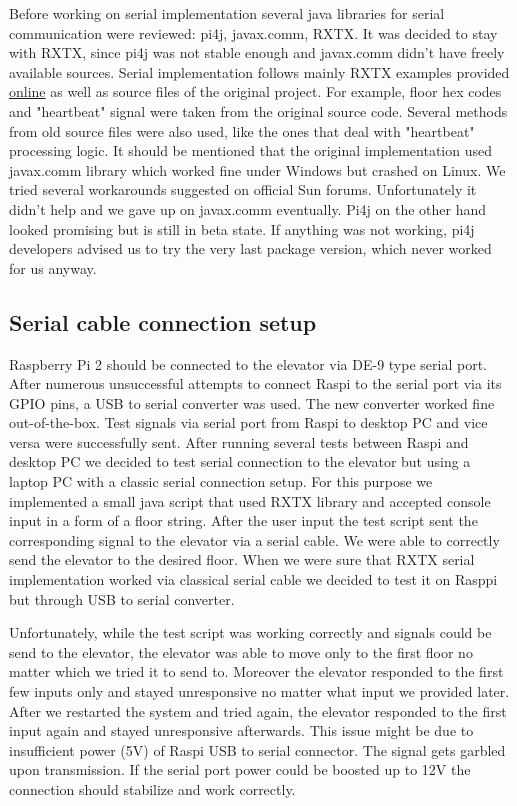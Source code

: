 \documentclass[a4paper, 12pt]{article}
\begin{document}
Before working on serial implementation several java libraries for serial communication were reviewed: pi4j, javax.comm, RXTX.
It was decided to stay with RXTX, since pi4j was not stable enough and javax.comm didn't have freely available sources.
Serial implementation follows mainly RXTX examples provided \href{http://rxtx.qbang.org/wiki/index.php/Two_way_communcation_with_the_serial_port}{online} as well as source files of the original project.
For example, floor hex codes and "heartbeat" signal were taken from the original source code.
Several methods from old source files were also used, like the ones that deal with "heartbeat" processing logic.
It should be mentioned that the original implementation used javax.comm library which worked fine under Windows but crashed on Linux.
We tried several workarounds suggested on official Sun forums.
Unfortunately it didn't help and we gave up on javax.comm eventually.
Pi4j on the other hand looked promising but is still in beta state.
If anything was not working, pi4j developers advised us to try the very last package version, which never worked for us anyway.

\subsection{Serial cable connection setup}
\label{sec:Serial_cable_connection_setup}
Raspberry Pi 2 should be connected to the elevator via DE-9 type serial port.
After numerous unsuccessful attempts to connect Raspi to the serial port via its GPIO pins, a USB to serial converter was used.
The new converter worked fine out-of-the-box.
Test signals via serial port from Raspi to desktop PC and vice versa were successfully sent.
After running several tests between Raspi and desktop PC we decided to test serial connection to the elevator but using a laptop PC with a classic serial connection setup.
For this purpose we implemented a small java script that used RXTX library and accepted console input in a form of a floor string.
After the user input the test script sent the corresponding signal to the elevator via a serial cable.
We were able to correctly send the elevator to the desired floor. When we were sure that RXTX serial implementation worked via classical serial cable we decided to test it on Rasppi but through USB to serial converter.

Unfortunately, while the test script was working correctly and signals could be send to the elevator, the elevator was able to move only to the first floor no matter which we tried it to send to.
Moreover the elevator responded to the first few inputs only and stayed unresponsive no matter what input we provided later. After we restarted the system and tried again, the elevator responded to the first input again and stayed unresponsive afterwards.
This issue might be due to insufficient power (5V) of Raspi USB to serial connector.
The signal gets garbled upon transmission.
If the serial port power could be boosted up to 12V the connection should stabilize and work correctly.
\end{document}
